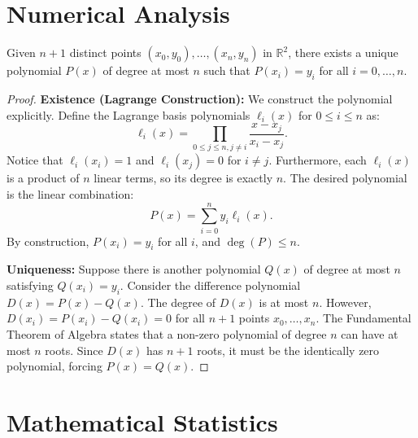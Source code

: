 \documentclass[11pt]{scrartcl}
\begin{document}
\section{Numerical Analysis}

\begin{theorem}
    Given $n+1$ distinct points $(x_0, y_0), \dots, (x_n, y_n)$ in $\mathbb{R}^2$, there exists a unique polynomial $P(x)$ of degree at most $n$ such that $P(x_i) = y_i$ for all $i = 0, \dots, n$.
\end{theorem}
\begin{proof}
    \textbf{Existence (Lagrange Construction):} We construct the polynomial explicitly. Define the Lagrange basis polynomials $\ell_i(x)$ for $0 \le i \le n$ as:
    \[ \ell_i(x) = \prod_{0 \le j \le n, j \neq i} \frac{x - x_j}{x_i - x_j}. \]
    Notice that $\ell_i(x_i) = 1$ and $\ell_i(x_j) = 0$ for $i \neq j$. Furthermore, each $\ell_i(x)$ is a product of $n$ linear terms, so its degree is exactly $n$. The desired polynomial is the linear combination:
    \[ P(x) = \sum_{i=0}^n y_i \ell_i(x). \]
    By construction, $P(x_i) = y_i$ for all $i$, and $\deg(P) \le n$.
    
    \textbf{Uniqueness:} Suppose there is another polynomial $Q(x)$ of degree at most $n$ satisfying $Q(x_i) = y_i$. Consider the difference polynomial $D(x) = P(x) - Q(x)$. The degree of $D(x)$ is at most $n$. However, $D(x_i) = P(x_i) - Q(x_i) = 0$ for all $n+1$ points $x_0, \dots, x_n$. The Fundamental Theorem of Algebra states that a non-zero polynomial of degree $n$ can have at most $n$ roots. Since $D(x)$ has $n+1$ roots, it must be the identically zero polynomial, forcing $P(x) = Q(x)$.
\end{proof}

\section{Mathematical Statistics}
\end{document}
